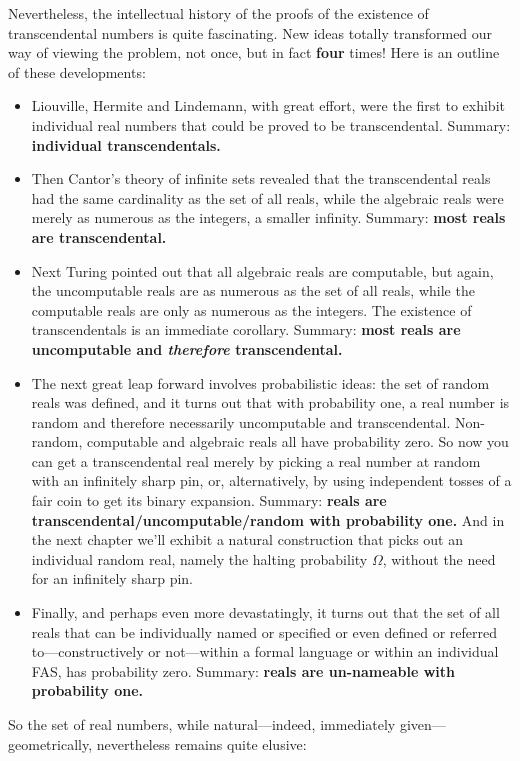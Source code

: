 \documentclass[12pt]{book}
\begin{document}
Nevertheless, the intellectual history of the proofs of the existence of transcendental numbers
is quite fascinating. New ideas totally transformed
our way of viewing the problem, not once, but in fact \textbf{four} times!
Here is an outline of these developments:
\begin{itemize}
\item
Liouville, Hermite and Lindemann, with great effort, were the first to exhibit individual
real numbers that could be proved to be transcendental. 
Summary: \textbf{individual transcendentals.}
\item
Then Cantor's theory of infinite sets revealed that the transcendental
reals had the same cardinality as the set of all reals, while the algebraic reals were merely
as numerous as the integers, a smaller infinity.
Summary: \textbf{most reals are transcendental.}
\item
Next Turing pointed out that all algebraic reals are computable, but again, the uncomputable
reals are as numerous as the set of all reals, while the computable reals are only as
numerous as the integers. The existence of transcendentals is
an immediate corollary.
Summary: \textbf{most reals are uncomputable and \emph{therefore} transcendental.}
\item
The next great leap forward involves probabilistic ideas: the set of random
reals was defined, and it turns out that with probability one, 
a real number is random and therefore necessarily
uncomputable and transcendental. Non-random, computable and algebraic reals
all have probability zero.  So now you can get a transcendental real merely by picking a real
number at random with an infinitely sharp pin, or, 
alternatively, by using independent tosses of a fair
coin to get its binary expansion.
Summary: \textbf{reals are transcendental/uncomputable/random with probability one.}
And in the next chapter 
we'll exhibit a natural construction that picks out an individual random real, namely
the halting probability $\Omega$,
without the need for an infinitely sharp pin.
\item
Finally, and perhaps even more devastatingly, 
it turns out that the set of all reals that can be individually named or specified
or even defined or referred to---constructively or not---within a formal language 
or within an individual FAS, has probability zero.
Summary: \textbf{reals are un-nameable with probability one.}
\end{itemize}
So the set of real numbers, 
while natural---indeed, immediately given---geometrically, nevertheless remains quite elusive:
 
\end{document}
